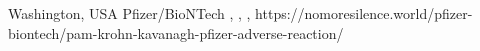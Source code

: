           {Washington, USA}
          {}
          {Pfizer/BioNTech}
          {}
          {
            ,
            ,
            ,
          }
          {https://nomoresilence.world/pfizer-biontech/pam-krohn-kavanagh-pfizer-adverse-reaction/}

